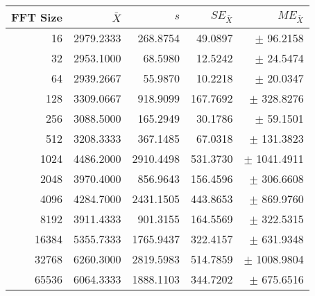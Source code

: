 \begin{tabular}{|r|r|r|r|r|}\hline
    FFT Size & $\bar{X}$ & $s$ & $SE_{\bar{X}}$ & $ME_{\bar{X}}$ \\ \hline
    16 & 2979.2333 & 268.8754 & 49.0897 & $\pm$ 96.2158 \\ \hline
    32 & 2953.1000 & 68.5980 & 12.5242 & $\pm$ 24.5474 \\ \hline
    64 & 2939.2667 & 55.9870 & 10.2218 & $\pm$ 20.0347 \\ \hline
    128 & 3309.0667 & 918.9099 & 167.7692 & $\pm$ 328.8276 \\ \hline
    256 & 3088.5000 & 165.2949 & 30.1786 & $\pm$ 59.1501 \\ \hline
    512 & 3208.3333 & 367.1485 & 67.0318 & $\pm$ 131.3823 \\ \hline
    1024 & 4486.2000 & 2910.4498 & 531.3730 & $\pm$ 1041.4911 \\ \hline
    2048 & 3970.4000 & 856.9643 & 156.4596 & $\pm$ 306.6608 \\ \hline
    4096 & 4284.7000 & 2431.1505 & 443.8653 & $\pm$ 869.9760 \\ \hline
    8192 & 3911.4333 & 901.3155 & 164.5569 & $\pm$ 322.5315 \\ \hline
    16384 & 5355.7333 & 1765.9437 & 322.4157 & $\pm$ 631.9348 \\ \hline
    32768 & 6260.3000 & 2819.5983 & 514.7859 & $\pm$ 1008.9804 \\ \hline
    65536 & 6064.3333 & 1888.1103 & 344.7202 & $\pm$ 675.6516 \\ \hline
\end{tabular}
